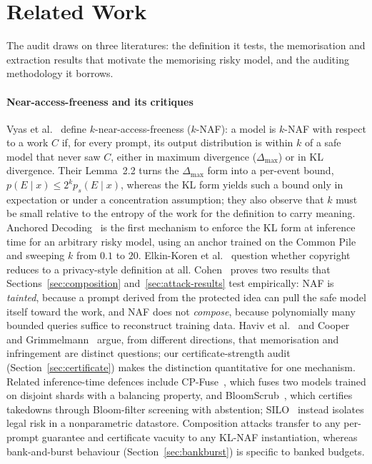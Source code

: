 \section{Related Work}\label{sec:related}

The audit draws on three literatures: the definition it tests, the memorisation and extraction results that motivate the memorising risky model, and the auditing methodology it borrows.

\paragraph{Near-access-freeness and its critiques}
Vyas et al.~\cite{vyas2023provable} define $k$-near-access-freeness ($k$-NAF): a model is $k$-NAF with respect to a work $C$ if, for every prompt, its output distribution is within $k$ of a safe model that never saw $C$, either in maximum divergence ($\Delta_{\max}$) or in KL divergence. Their Lemma~2.2 turns the $\Delta_{\max}$ form into a per-event bound, $p(E \mid x) \le 2^{k} p_s(E \mid x)$, whereas the KL form yields such a bound only in expectation or under a concentration assumption; they also observe that $k$ must be small relative to the entropy of the work for the definition to carry meaning. Anchored Decoding~\cite{he2026anchored} is the first mechanism to enforce the KL form at inference time for an arbitrary risky model, using an anchor trained on the Common Pile~\cite{kandpal2025commonpile} and sweeping $k$ from $0.1$ to $20$. Elkin-Koren et al.~\cite{elkinkoren2024copyright} question whether copyright reduces to a privacy-style definition at all. Cohen~\cite{cohen2025blameless} proves two results that Sections~\ref{sec:composition} and~\ref{sec:attack-results} test empirically: NAF is \emph{tainted}, because a prompt derived from the protected idea can pull the safe model itself toward the work, and NAF does not \emph{compose}, because polynomially many bounded queries suffice to reconstruct training data. Haviv et al.~\cite{haviv2026separate} and Cooper and Grimmelmann~\cite{cooper2025files} argue, from different directions, that memorisation and infringement are distinct questions; our certificate-strength audit (Section~\ref{sec:certificate}) makes the distinction quantitative for one mechanism. Related inference-time defences include CP-Fuse~\cite{abad2025cpfuse}, which fuses two models trained on disjoint shards with a balancing property, and BloomScrub~\cite{zhang2025bloomscrub}, which certifies takedowns through Bloom-filter screening with abstention; SILO~\cite{min2024silo} instead isolates legal risk in a nonparametric datastore. Composition attacks transfer to any per-prompt guarantee and certificate vacuity to any KL-NAF instantiation, whereas bank-and-burst behaviour (Section~\ref{sec:bankburst}) is specific to banked budgets.

